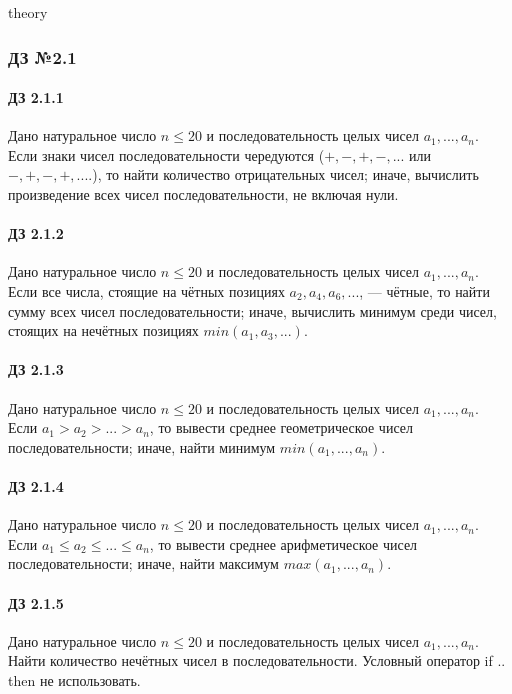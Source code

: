 \documentclass[12pt,a4paper]{report}
\begin{document}
\parindent=1cm
\pagestyle{empty}

\lstset{ language=Pascal, basicstyle=\small\ttfamily, numbers=left, numberstyle=\tiny, stepnumber=1, numbersep=5pt, extendedchars=\true, showstringspaces=false, breakatwhitespace=true, frame=single, keepspaces=true }

\clearpage
theory

\clearpage
\clearpage
\subsubsection*{ДЗ №2.1}
\paragraph*{ДЗ 2.1.1} Дано натуральное число $n \le 20$ и последовательность целых чисел $a_1, ..., a_n$. Если знаки чисел последовательности чередуются ($+,-,+,-, ...$ или $-,+,-,+, ....$), то найти количество отрицательных чисел; иначе, вычислить произведение всех чисел последовательности, не включая нули.
\paragraph*{ДЗ 2.1.2} Дано натуральное число $n \le 20$ и последовательность целых чисел $a_1, ..., a_n$. Если все числа, стоящие на чётных позициях $a_2, a_4, a_6, ...$, --- чётные, то найти сумму всех чисел последовательности; иначе, вычислить минимум среди чисел, стоящих на нечётных позициях $min(a_1, a_3, ...)$.
\paragraph*{ДЗ 2.1.3} Дано натуральное число $n \le 20$ и последовательность целых чисел $a_1, ..., a_n$. Если $a_1 > a_2 > ... > a_n$, то вывести среднее геометрическое чисел последовательности; иначе, найти минимум $min(a_1, ..., a_n)$.
\paragraph*{ДЗ 2.1.4} Дано натуральное число $n \le 20$ и последовательность целых чисел $a_1, ..., a_n$. Если $a_1 \le a_2 \le ... \le a_n$, то вывести среднее арифметическое чисел последовательности; иначе, найти максимум $max(a_1, ..., a_n)$.
\paragraph*{ДЗ 2.1.5} Дано натуральное число $n \le 20$ и последовательность целых чисел $a_1, ..., a_n$. Найти количество нечётных чисел в последовательности. Условный оператор if .. then не использовать.
\end{document}
